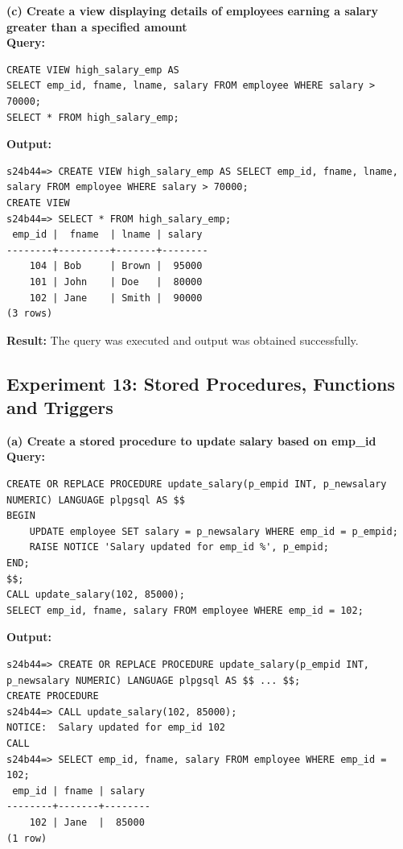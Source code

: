 \documentclass[12pt, a4paper]{article}
\begin{document}
\textbf{(c) Create a view displaying details of employees earning a salary greater than a specified amount}\\
\textbf{Query:}
\begin{lstlisting}
CREATE VIEW high_salary_emp AS
SELECT emp_id, fname, lname, salary FROM employee WHERE salary > 70000;
SELECT * FROM high_salary_emp;
\end{lstlisting}
\textbf{Output:}
\begin{lstlisting}[style=terminal]
s24b44=> CREATE VIEW high_salary_emp AS SELECT emp_id, fname, lname, salary FROM employee WHERE salary > 70000;
CREATE VIEW
s24b44=> SELECT * FROM high_salary_emp;
 emp_id |  fname  | lname | salary 
--------+---------+-------+--------
    104 | Bob     | Brown |  95000
    101 | John    | Doe   |  80000
    102 | Jane    | Smith |  90000
(3 rows)
\end{lstlisting}
\textbf{Result:} The query was executed and output was obtained successfully.


\newpage
\subsection*{Experiment 13: Stored Procedures, Functions and Triggers}

\textbf{(a) Create a stored procedure to update salary based on emp\_id}\\
\textbf{Query:}
\begin{lstlisting}
CREATE OR REPLACE PROCEDURE update_salary(p_empid INT, p_newsalary NUMERIC) LANGUAGE plpgsql AS $$
BEGIN
    UPDATE employee SET salary = p_newsalary WHERE emp_id = p_empid;
    RAISE NOTICE 'Salary updated for emp_id %', p_empid;
END;
$$;
CALL update_salary(102, 85000);
SELECT emp_id, fname, salary FROM employee WHERE emp_id = 102;
\end{lstlisting}
\textbf{Output:}
\begin{lstlisting}[style=terminal]
s24b44=> CREATE OR REPLACE PROCEDURE update_salary(p_empid INT, p_newsalary NUMERIC) LANGUAGE plpgsql AS $$ ... $$;
CREATE PROCEDURE
s24b44=> CALL update_salary(102, 85000);
NOTICE:  Salary updated for emp_id 102
CALL
s24b44=> SELECT emp_id, fname, salary FROM employee WHERE emp_id = 102;
 emp_id | fname | salary 
--------+-------+--------
    102 | Jane  |  85000
(1 row)
\end{lstlisting}
\end{document}
